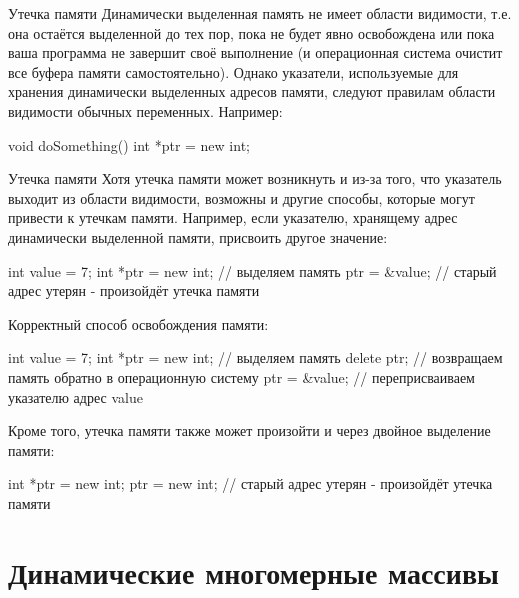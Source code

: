 \documentclass[
    9pt,
    hyperref={pdfencoding=unicode}
    ]{beamer}
\theoremstyle{definition}
\begin{document}
\begin{frame}[fragile]{Утечка памяти}
    Динамически выделенная память не имеет области видимости, т.е. она остаётся выделенной до тех пор, пока не будет явно освобождена или пока ваша программа не завершит своё выполнение (и операционная система очистит все буфера памяти самостоятельно). Однако указатели, используемые для хранения динамически выделенных адресов памяти, следуют правилам области видимости обычных переменных. Например:
    \begin{cppcode}
        void doSomething(){
            int *ptr = new int;
        }
    \end{cppcode}

   
\end{frame}

\begin{frame}[fragile]{Утечка памяти}
    Хотя утечка памяти может возникнуть и из-за того, что указатель выходит из области видимости, возможны и другие способы, которые могут привести к утечкам памяти. Например, если указателю, хранящему адрес динамически выделенной памяти, присвоить другое значение:
    \begin{cppcode}
        int value = 7;
        int *ptr = new int; // выделяем память
        ptr = &value; // старый адрес утерян - произойдёт утечка памяти
    \end{cppcode}
    
    Корректный способ освобождения памяти:
    \begin{cppcode}
        int value = 7;
        int *ptr = new int; // выделяем память
        delete ptr; // возвращаем память обратно в операционную систему
        ptr = &value; // переприсваиваем указателю адрес value
    \end{cppcode}

    Кроме того, утечка памяти также может произойти и через двойное выделение памяти:
    \begin{cppcode}
        int *ptr = new int;
        ptr = new int; // старый адрес утерян - произойдёт утечка памяти
    \end{cppcode}
    
\end{frame}

\section{Динамические многомерные массивы}
\end{document}
